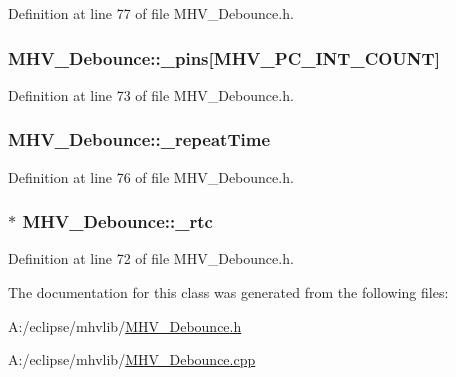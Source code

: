 \-Definition at line 77 of file \-M\-H\-V\-\_\-\-Debounce.\-h.

\hypertarget{class_m_h_v___debounce_a5cf65bfecfc0efd4d51e1506972d2796}{
\subsubsection[{\-\_\-pins}]{ {\bf \-M\-H\-V\-\_\-\-Debounce\-::\-\_\-pins}\mbox{[}\-M\-H\-V\-\_\-\-P\-C\-\_\-\-I\-N\-T\-\_\-\-C\-O\-U\-N\-T\mbox{]}}}
\label{class_m_h_v___debounce_a5cf65bfecfc0efd4d51e1506972d2796}


\-Definition at line 73 of file \-M\-H\-V\-\_\-\-Debounce.\-h.

\hypertarget{class_m_h_v___debounce_a422167777e3bfcf6b7b46b992058950f}{
\subsubsection[{\-\_\-repeat\-Time}]{ {\bf \-M\-H\-V\-\_\-\-Debounce\-::\-\_\-repeat\-Time}}}
\label{class_m_h_v___debounce_a422167777e3bfcf6b7b46b992058950f}


\-Definition at line 76 of file \-M\-H\-V\-\_\-\-Debounce.\-h.

\hypertarget{class_m_h_v___debounce_a33be0b2ba96f36fb920ad9f2dc27d4c8}{
\subsubsection[{\-\_\-rtc}]{$\ast$ {\bf \-M\-H\-V\-\_\-\-Debounce\-::\-\_\-rtc}}}
\label{class_m_h_v___debounce_a33be0b2ba96f36fb920ad9f2dc27d4c8}


\-Definition at line 72 of file \-M\-H\-V\-\_\-\-Debounce.\-h.



\-The documentation for this class was generated from the following files\-:\begin{DoxyCompactItemize}
\item 
\-A\-:/eclipse/mhvlib/\hyperlink{_m_h_v___debounce_8h}{\-M\-H\-V\-\_\-\-Debounce.\-h}\item 
\-A\-:/eclipse/mhvlib/\hyperlink{_m_h_v___debounce_8cpp}{\-M\-H\-V\-\_\-\-Debounce.\-cpp}\end{DoxyCompactItemize}
